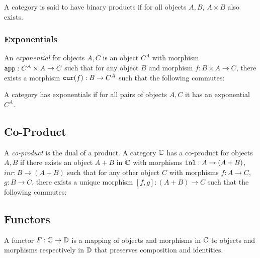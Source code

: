 \documentclass{Report}
\begin{document}

A category is said to have binary products if for all objects $A, B$, $A\times B$ also exists.

\subsubsection{Exponentials}
An \textit{exponential} for objects $A, C$ is an object $C^A$ with morphism $\texttt{app}: C^A\times A \rightarrow C$ such that for any object $B$ and morphism $f: B\times A \rightarrow C$, there exists a morphism $\texttt{cur}(f): B \rightarrow C^A$ such that the following commutes:


A category has exponentials if for all pairs of objects $A, C$ it has an exponential $C^A$.

\subsection{Co-Product}
A \textit{co-product} is the dual of a product. A category $\mathbb{C}$ has a co-product for objects $A, B$ if there exists an object $A+B$ in $\mathbb{C}$ with morphisms $\texttt{inl}: A\rightarrow (A+B)$, $inr: B\rightarrow (A+B)$ such that for any other object $C$ with morphisms $f: A\rightarrow C$, $g: B\rightarrow C$, there exists a unique morphism $[f, g]: (A + B)\rightarrow C $ such that the following commutes:





\subsection{Functors}
A functor $F: \mathbb{C} \rightarrow \mathbb{D}$ is a mapping of objects and morphisms in $\mathbb{C}$ to objects and morphisms respectively in $\mathbb{D}$ that preserves composition and identities.
\end{document}
